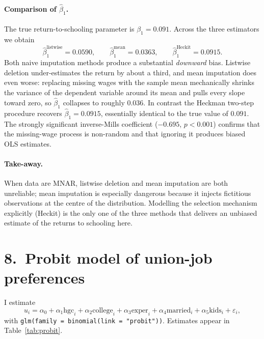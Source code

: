 \documentclass[11pt]{article}
\begin{document}
\paragraph{Comparison of $\hat{\beta}_1$.}
The true return-to-schooling parameter is $\beta_1 = 0.091$.  Across the
three estimators we obtain
\[
   \hat{\beta}_1^{\text{listwise}} = 0.0590, \qquad
   \hat{\beta}_1^{\text{mean}}     = 0.0363, \qquad
   \hat{\beta}_1^{\text{Heckit}}   = 0.0915.
\]
Both naive imputation methods produce a substantial \emph{downward} bias.
Listwise deletion under-estimates the return by about a third, and mean
imputation does even worse: replacing missing wages with the sample mean
mechanically shrinks the variance of the dependent variable around its mean
and pulls every slope toward zero, so $\hat{\beta}_1$ collapses to roughly
$0.036$.  In contrast the Heckman two-step procedure recovers
$\hat{\beta}_1 = 0.0915$, essentially identical to the true value of
$0.091$.  The strongly significant inverse-Mills coefficient
($-0.695$, $p < 0.001$) confirms that the missing-wage process is non-random
and that ignoring it produces biased OLS estimates.

\paragraph{Take-away.}  When data are MNAR, listwise deletion and mean
imputation are both unreliable; mean imputation is especially dangerous
because it injects fictitious observations at the centre of the
distribution.  Modelling the selection mechanism explicitly (Heckit) is the
only one of the three methods that delivers an unbiased estimate of the
returns to schooling here.

\section*{8.\ Probit model of union-job preferences}
I estimate
\[
   u_i = \alpha_0 + \alpha_1 \text{hgc}_i + \alpha_2 \text{college}_i +
         \alpha_3 \text{exper}_i + \alpha_4 \text{married}_i +
         \alpha_5 \text{kids}_i + \varepsilon_i,
\]
with \texttt{glm(family = binomial(link = "probit"))}.  Estimates appear in
Table~\ref{tab:probit}.
\end{document}
